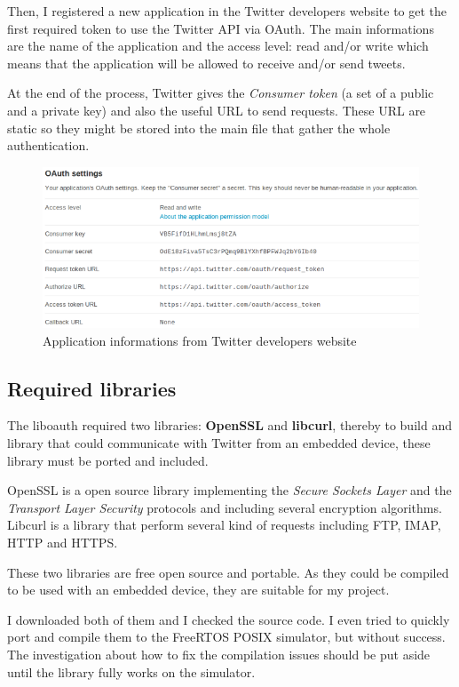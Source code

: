 Then, I registered a new application in the Twitter developers website to get the first required token to use the Twitter API via OAuth. The main informations are the name of the application and the access level: read and/or write which means that the application will be allowed to receive and/or send tweets.

At the end of the process, Twitter gives the \textit{Consumer token} (a set of a public and a private key) and also the useful URL to send requests. These URL are static so they might be stored into the main file that gather the whole authentication. 

\clearpage
\begin{figure}[h]
  \centering
  \includegraphics[scale=0.75]{images/register.png}
  \caption{Application informations from Twitter developers website}
\end{figure}


\subsection{Required libraries}

\hspace{15mm}The liboauth required two libraries: \textbf{OpenSSL} and \textbf{libcurl}, thereby to build and library that could communicate with Twitter from an embedded device, these library must be ported and included.

OpenSSL is a open source library implementing the \textit{Secure Sockets Layer} and the \textit{Transport Layer Security} protocols and including several encryption algorithms. Libcurl is a library that perform several kind of requests including FTP, IMAP, HTTP and HTTPS.

These two libraries are free open source and portable. As they could be compiled to be used with an embedded device, they are suitable for my project.

I downloaded both of them and I checked the source code. I even tried to quickly port and compile them to the FreeRTOS POSIX simulator, but without success. The investigation about how to fix the compilation issues should be put aside until the library fully works on the simulator.


\clearpage